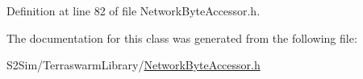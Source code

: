 Definition at line 82 of file Network\-Byte\-Accessor.\-h.



The documentation for this class was generated from the following file\-:\begin{DoxyCompactItemize}
\item 
S2\-Sim/\-Terraswarm\-Library/\hyperlink{_network_byte_accessor_8h}{Network\-Byte\-Accessor.\-h}\end{DoxyCompactItemize}
